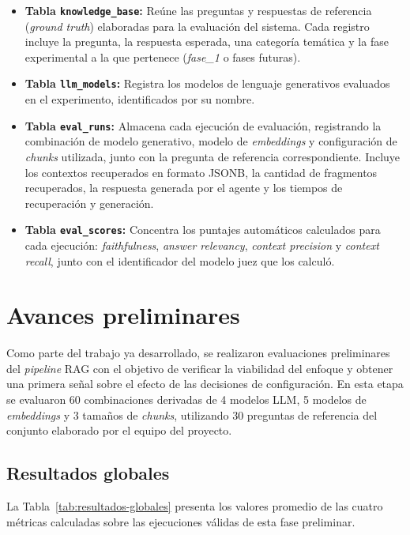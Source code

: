 \documentclass{article}
\begin{document}
\begin{itemize}
  \item \textbf{Tabla \texttt{knowledge\_base}:} Reúne las preguntas y respuestas de referencia (\textit{ground truth}) elaboradas para la evaluación del sistema. Cada registro incluye la pregunta, la respuesta esperada, una categoría temática y la fase experimental a la que pertenece (\textit{fase\_1} o fases futuras).
  \item \textbf{Tabla \texttt{llm\_models}:} Registra los modelos de lenguaje generativos evaluados en el experimento, identificados por su nombre.
  \item \textbf{Tabla \texttt{eval\_runs}:} Almacena cada ejecución de evaluación, registrando la combinación de modelo generativo, modelo de \textit{embeddings} y configuración de \textit{chunks} utilizada, junto con la pregunta de referencia correspondiente. Incluye los contextos recuperados en formato JSONB, la cantidad de fragmentos recuperados, la respuesta generada por el agente y los tiempos de recuperación y generación.
  \item \textbf{Tabla \texttt{eval\_scores}:} Concentra los puntajes automáticos calculados para cada ejecución: \textit{faithfulness}, \textit{answer relevancy}, \textit{context precision} y \textit{context recall}, junto con el identificador del modelo juez que los calculó.
\end{itemize}

\section{Avances preliminares}

Como parte del trabajo ya desarrollado, se realizaron evaluaciones preliminares del \textit{pipeline} RAG con el objetivo de verificar la viabilidad del enfoque y obtener una primera señal sobre el efecto de las decisiones de configuración. En esta etapa se evaluaron 60 combinaciones derivadas de 4 modelos LLM, 5 modelos de \textit{embeddings} y 3 tamaños de \textit{chunks}, utilizando 30 preguntas de referencia del conjunto elaborado por el equipo del proyecto.

\subsection{Resultados globales}

La Tabla~\ref{tab:resultados-globales} presenta los valores promedio de las cuatro métricas calculadas sobre las ejecuciones válidas de esta fase preliminar.
\end{document}
